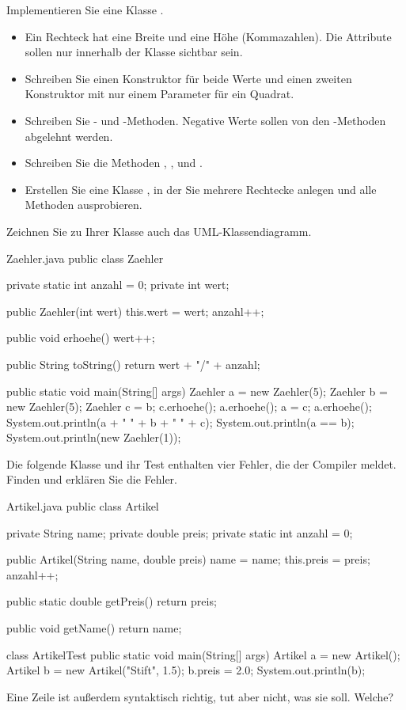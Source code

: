 Implementieren Sie eine Klasse .
\begin{itemize}[itemsep=0.1em]
\item Ein Rechteck hat eine Breite und eine Höhe (Kommazahlen). Die Attribute sollen nur innerhalb der Klasse sichtbar sein.
\item Schreiben Sie einen Konstruktor für beide Werte und einen zweiten Konstruktor mit nur einem Parameter für ein Quadrat.
\item Schreiben Sie - und -Methoden. Negative Werte sollen von den -Methoden abgelehnt werden.
\item Schreiben Sie die Methoden , ,  und .
\item Erstellen Sie eine Klasse , in der Sie mehrere Rechtecke anlegen und alle Methoden ausprobieren.
\end{itemize}
Zeichnen Sie zu Ihrer Klasse auch das UML-Klassendiagramm.

\begin{javacode}{Zaehler.java}
public class Zaehler {
	private static int anzahl = 0;
	private int wert;

	public Zaehler(int wert) {
		this.wert = wert;
		anzahl++;
	}

	public void erhoehe() { wert++; }

	public String toString() { return wert + "/" + anzahl; }

	public static void main(String[] args) {
		Zaehler a = new Zaehler(5);
		Zaehler b = new Zaehler(5);
		Zaehler c = b;
		c.erhoehe();
		a.erhoehe();
		a = c;
		a.erhoehe();
		System.out.println(a + " " + b + " " + c);
		System.out.println(a == b);
		System.out.println(new Zaehler(1));
	}
}
\end{javacode}

Die folgende Klasse und ihr Test enthalten vier Fehler, die der Compiler meldet. Finden und erklären Sie die Fehler.
\begin{javacode}{Artikel.java}
public class Artikel {
	private String name;
	private double preis;
	private static int anzahl = 0;

	public Artikel(String name, double preis) {
		name = name;
		this.preis = preis;
		anzahl++;
	}

	public static double getPreis() {
		return preis;
	}

	public void getName() {
		return name;
	}
}

class ArtikelTest {
	public static void main(String[] args) {
		Artikel a = new Artikel();
		Artikel b = new Artikel("Stift", 1.5);
		b.preis = 2.0;
		System.out.println(b);
	}
}
\end{javacode}
Eine Zeile ist außerdem syntaktisch richtig, tut aber nicht, was sie soll. Welche?

